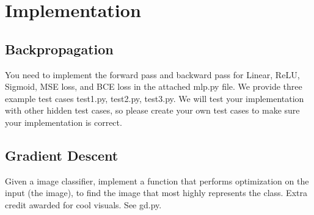 \documentclass{article}
\begin{document}
\section*{Implementation}
%
\subsection*{Backpropagation }
You need to implement the forward pass and backward pass for Linear, ReLU,
Sigmoid, MSE loss, and BCE loss in the attached mlp.py file. We provide three
example test cases test1.py, test2.py, test3.py. We will test your
implementation with other hidden test cases, so please create your own test
cases to make sure your implementation is correct.
\subsection*{Gradient Descent}
Given a image classifier, implement a function that performs optimization on
the input (the image), to find the image that most highly represents the class.
Extra credit awarded for cool visuals. See gd.py.
\end{document}
